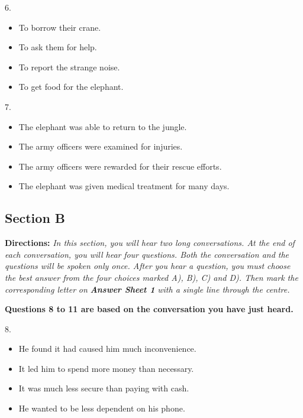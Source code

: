 \documentclass[UTF8,11pt]{ctexart}
\begin{document}
6.


\begin{itemize}[leftmargin=2em,itemsep=.2em,topsep=.4em]\item[A.] To borrow their crane.
\item[B.] To ask them for help.
\item[C.] To report the strange noise.
\item[D.] To get food for the elephant.
\end{itemize}

7.


\begin{itemize}[leftmargin=2em,itemsep=.2em,topsep=.4em]\item[A.] The elephant was able to return to the jungle.
\item[B.] The army officers were examined for injuries.
\item[C.] The army officers were rewarded for their rescue efforts.
\end{itemize}

\begin{itemize}[leftmargin=2em,itemsep=.2em,topsep=.4em]\item[D.] The elephant was given medical treatment for many days.
\end{itemize}

\subsection*{\textbf{Section B}}


\textbf{Directions:} \textit{In this section, you will hear two long conversations. At the end of each conversation, you will hear} \textit{four questions. Both the conversation and the questions will be spoken only once. After you hear a question, you} \textit{must choose the best answer from the four choices marked A), B), C) and D). Then mark the corresponding letter} \textit{on }\textbf{\textit{Answer Sheet 1}}\textit{ with a single line through the centre.}


\textbf{Questions 8 to 11 are based on the conversation you have just heard.}


8.


\begin{itemize}[leftmargin=2em,itemsep=.2em,topsep=.4em]\item[A.] He found it had caused him much inconvenience.
\item[B.] It led him to spend more money than necessary.
\item[C.] It was much less secure than paying with cash.
\item[D.] He wanted to be less dependent on his phone.
\end{itemize}
\end{document}
